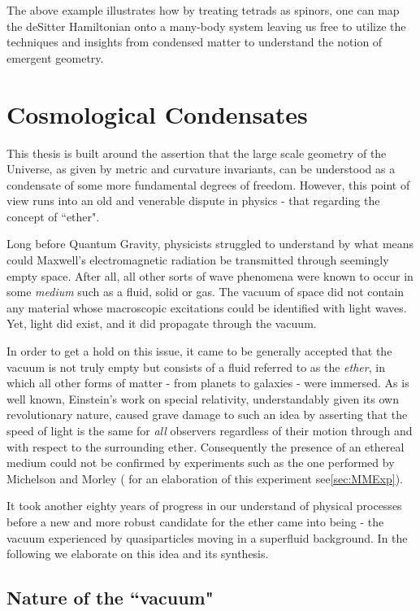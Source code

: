 \begin{doublespace}
The above example illustrates how by treating tetrads as spinors, one can map the deSitter Hamiltonian onto a many-body system leaving us free to utilize the techniques and insights from condensed matter to understand the notion of emergent geometry.

\section{Cosmological Condensates}

This thesis is built around the assertion that the large scale geometry of the Universe, as given by metric and curvature invariants, can be understood as a condensate of some more fundamental degrees of freedom. However, this point of view runs into an old and venerable dispute in physics - that regarding the concept of ``ether".

Long before Quantum Gravity, physicists struggled to understand by what means could Maxwell's electromagnetic radiation be transmitted through seemingly empty space. After all, all other sorts of wave phenomena were known to occur in some \emph{medium} such as a fluid, solid or gas. The vacuum of space did not contain any material whose macroscopic excitations could be identified with light waves. Yet, light did exist, and it did propagate through the vacuum.

In order to get a hold on this issue, it came to be generally accepted that the vacuum is not truly empty but consists of a fluid referred to as the \emph{ether}, in which all other forms of matter - from planets to galaxies - were immersed. As is well known, Einstein's work on special relativity, understandably given its own revolutionary nature, caused grave damage to such an idea by asserting that the speed of light is the same for \emph{all} observers regardless of their motion through and with respect to the surrounding ether. Consequently the presence of an ethereal medium could not be confirmed by experiments such as the one performed by Michelson and Morley ( for an elaboration of this experiment see\ref{sec:MMExp}).

It took another eighty years of progress in our understand of physical processes before a new and more robust candidate for the ether came into being - the vacuum experienced by quasiparticles moving in a superfluid background. In the following we elaborate on this idea and its synthesis.

\subsection{Nature of the ``vacuum"}


\end{doublespace}
